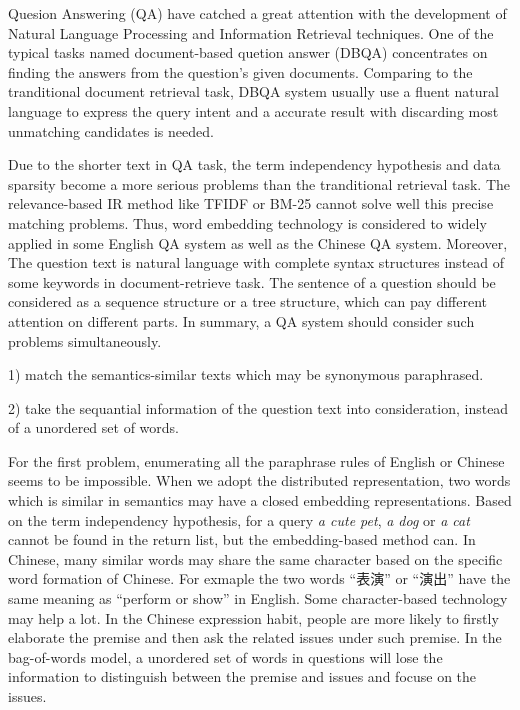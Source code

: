 \documentclass{llncs}
\begin{document}
Quesion Answering (QA) have catched a great attention with the development of Natural Language Processing and Information Retrieval techniques. One of the typical tasks named document-based quetion answer (DBQA) concentrates on finding the answers from the question's given documents.
Comparing to the tranditional document retrieval task, DBQA system usually use a fluent natural language to express the query intent and a accurate result with discarding most unmatching candidates is needed. 

Due to the shorter text in QA task, the term independency hypothesis and data sparsity become a more serious problems than the tranditional retrieval task. The relevance-based IR method like TFIDF or BM-25 cannot solve well this precise matching problems. Thus, word embedding technology \cite{Mikolov2013Efficient} is considered to widely applied in some English QA system as well as the Chinese QA system. Moreover, The question text is natural language with complete syntax structures instead of some keywords in document-retrieve task. The sentence of a question should be considered as a sequence structure or a tree structure, which can pay different attention on different parts. In summary, a QA system should consider such problems simultaneously.

1) match the semantics-similar texts which may be synonymous paraphrased.  

2) take the sequantial information of the question text into consideration, instead of a unordered set of words.

For the first problem, enumerating all the paraphrase rules of English or Chinese seems to be impossible. When we adopt the distributed representation, two words which is similar in semantics may have a closed embedding representations.  Based on the term independency hypothesis, for a query \emph{a cute pet}, \emph{a dog} or \emph{a cat} cannot be found in the return list, but the embedding-based method can. In Chinese, many similar words may share the same character based on the specific word formation of Chinese. For exmaple the two words ``表演'' or ``演出'' have the same meaning as ``perform or show'' in English. Some character-based technology may help a lot.  
In the Chinese expression habit, people are more likely to firstly elaborate the premise  and then ask the related issues under such premise. In the bag-of-words model, a unordered set of words in questions  will lose the information to distinguish between the premise and issues and focuse on the issues.
\end{document}
